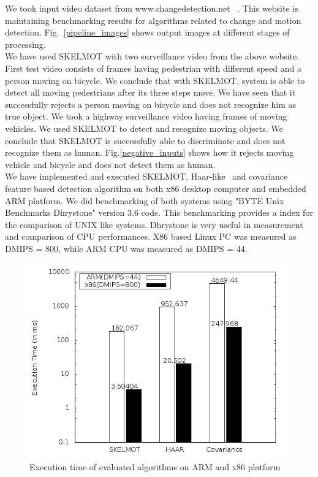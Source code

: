 \indent We took input video dataset from www.changedetection.net
~\cite{36}. This website is maintaining benchmarking results for
algorithms related to change and motion detection. Fig.~\ref{pipeline_images} shows
output images at different stages of processing.\\
\indent We have used SKELMOT with two surveillance video from the above
website. First test video consists of frames having pedestrian with
different speed and a person moving on bicycle. We conclude that with
SKELMOT, system is able to detect all moving pedestrians after its three
steps move. We have seen that it successfully rejects a person moving on
bicycle and does not recognize him as true object. We took a highway
surveillance video having frames of moving vehicles. We used SKELMOT to
detect and recognize moving objects. We conclude that SKELMOT is
successfully able to discriminate and does not recognize them as human.
Fig.\ref{negative_inputs} shows how it rejects moving vehicle and
bicycle and does not detect them as human.\\
\indent We have implemented and executed SKELMOT, Haar-like~\cite{19} and
covariance~\cite{19} feature based detection algorithm on both x86
desktop computer and embedded ARM platform. We did benchmarking of both
systems using "BYTE Unix Benchmarks Dhrystone" version 3.6 code. This benchmarking
provides a index for the comparison of UNIX like systems. Dhrystone is
very useful in measurement and comparison of CPU performances. X86 based
Linux PC was measured as DMIPS = 800, while ARM CPU was measured as
DMIPS = 44.\\
\begin{figure}[!b]
\centering
\includegraphics[scale=0.60]{Figures/pipeline_execution_time}
\caption{Execution time of evaluated algorithms on ARM and x86
platform}
\label{pipeline_execution_time}
\end{figure}
